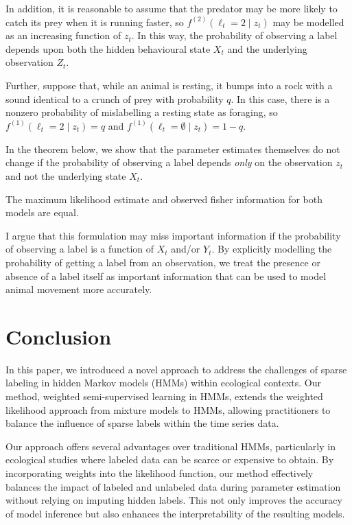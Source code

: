 In addition, it is reasonable to assume that the predator may be more likely to catch its prey when it is running faster, so $f^{(2)}(\ell_t = 2 \mid z_t)$ may be modelled as an increasing function of $z_t$. %
In this way, the probability of observing a label depends upon both the hidden behavioural state $X_t$ and the underlying observation $Z_t$.

Further, suppose that, while an animal is resting, it bumps into a rock with a sound identical to a crunch of prey with probability $q$. In this case, there is a nonzero probability of mislabelling a resting state as foraging, so $f^{(1)}(\ell_t = 2 \mid z_t) = q$ and $f^{(1)}(\ell_t = \emptyset \mid z_t) = 1-q$.

In the theorem below, we show that the parameter estimates themselves do not change if the probability of observing a label depends \textit{only} on the observation $z_t$ and not the underlying state $X_t$.

\begin{theorem}

    The maximum likelihood estimate and observed fisher information for both models are equal.

\end{theorem}

I argue that this formulation may miss important information if the probability of observing a label is a function of $X_t$ and/or $Y_t$. By explicitly modelling the probability of getting a label from an observation, we treat the presence or absence of a label itself as important information that can be used to model animal movement more accurately.

\iffalse 

\section{Conclusion}

In this paper, we introduced a novel approach to address the challenges of sparse labeling in hidden Markov models (HMMs) within ecological contexts. Our method, weighted semi-supervised learning in HMMs, extends the weighted likelihood approach from mixture models to HMMs, allowing practitioners to balance the influence of sparse labels within the time series data.

Our approach offers several advantages over traditional HMMs, particularly in ecological studies where labeled data can be scarce or expensive to obtain. By incorporating weights into the likelihood function, our method effectively balances the impact of labeled and unlabeled data during parameter estimation without relying on imputing hidden labels. This not only improves the accuracy of model inference but also enhances the interpretability of the resulting models.

